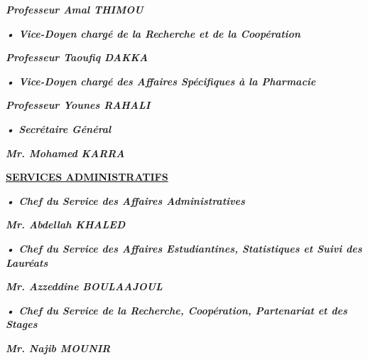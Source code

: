 \textbf{\emph{Professeur Amal THIMOU}}

\vspace*{0.8em}

\hspace*{.8em} \textbf{\emph{•	Vice-Doyen chargé de la Recherche et de la Coopération}}

\vspace*{.8em}

\textbf{\emph{Professeur Taoufiq DAKKA}}

\hspace*{.8em} \textbf{\emph{•	Vice-Doyen chargé des Affaires Spécifiques à la Pharmacie}}

\vspace*{.8em}

\textbf{\emph{Professeur Younes RAHALI}}

\hspace*{.8em} \textbf{\emph{•	Secrétaire Général }}

\vspace*{.8em}

\textbf{\emph{Mr. Mohamed KARRA}}

\pagebreak


\textbf{\underline{SERVICES ADMINISTRATIFS}}

\vspace*{1em}

\hspace*{.8em} \textbf{\emph{•	Chef du Service des Affaires Administratives}}

\vspace*{.8em}

\textbf{\emph{Mr. Abdellah KHALED}}

\hspace*{.8em} \textbf{\emph{•	Chef du Service des Affaires Estudiantines, Statistiques et Suivi des Lauréats}}

\vspace*{.8em}

\textbf{\emph{Mr. Azzeddine BOULAAJOUL}}

\hspace*{.8em} \textbf{\emph{•	Chef du Service de la Recherche, Coopération, Partenariat et des Stages }}

\vspace*{.8em}

\textbf{\emph{Mr. Najib MOUNIR}}

